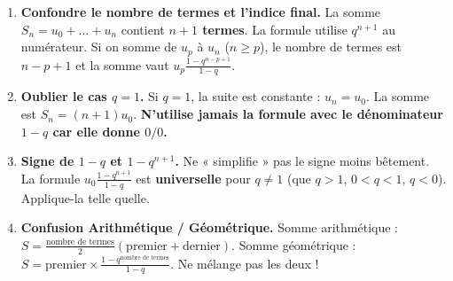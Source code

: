 \documentclass[11pt]{article}
\begin{document}
\begin{attention}
\begin{enumerate}
    \item \textbf{Confondre le nombre de termes et l'indice final.}
    La somme $S_n = u_0 + \dots + u_n$ contient \textbf{$n+1$ termes}. La formule utilise $q^{n+1}$ au numérateur.
    Si on somme de $u_p$ à $u_n$ ($n \ge p$), le nombre de termes est $n-p+1$ et la somme vaut $u_p \frac{1-q^{n-p+1}}{1-q}$.
    
    \item \textbf{Oublier le cas $q=1$.}
    Si $q=1$, la suite est constante : $u_n = u_0$. La somme est $S_n = (n+1)u_0$. \textbf{N'utilise jamais la formule avec le dénominateur $1-q$ car elle donne $0/0$.}
    
    \item \textbf{Signe de $1-q$ et $1-q^{n+1}$.}
    Ne « simplifie » pas le signe moins bêtement. La formule $u_0 \frac{1-q^{n+1}}{1-q}$ est \textbf{universelle} pour $q \neq 1$ (que $q>1$, $0<q<1$, $q<0$). Applique-la telle quelle.
    
    \item \textbf{Confusion Arithmétique / Géométrique.}
    Somme arithmétique : $S = \frac{\text{nombre de termes}}{2} (\text{premier} + \text{dernier})$.
    Somme géométrique : $S = \text{premier} \times \frac{1 - q^{\text{nombre de termes}}}{1-q}$.
    Ne mélange pas les deux !
\end{enumerate}
\end{attention}
\end{document}
